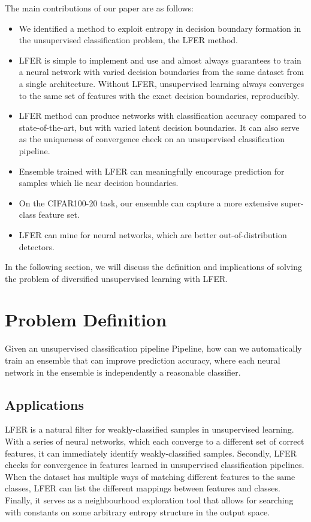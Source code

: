 \documentclass[journal]{journal}
\begin{document}
The main contributions of our paper are as follows:
\begin{itemize} 
\item We identified a method to exploit entropy in decision boundary formation in the unsupervised classification problem, the LFER method.
\item LFER is simple to implement and use and almost always guarantees to train a neural network with varied decision boundaries from the same dataset from a single architecture. Without LFER, unsupervised learning always converges to the same set of features with the exact decision boundaries,  reproducibly. 
\item LFER method can produce networks with classification accuracy compared to state-of-the-art, but with varied latent decision boundaries. It can also serve as the uniqueness of convergence check on an unsupervised classification pipeline.
\item Ensemble trained with LFER can meaningfully encourage prediction for samples which lie near decision boundaries. 
\item On the CIFAR100-20 task, our ensemble can capture a more extensive super-class feature set.
\item LFER can mine for neural networks, which are better out-of-distribution detectors.
\end{itemize}

In the following section, we will discuss the definition and implications of solving the problem of diversified unsupervised learning with LFER. 

\section{Problem Definition}
Given an unsupervised classification pipeline Pipeline, how can we automatically train an ensemble that can improve prediction accuracy,  where each neural network in the ensemble is independently a reasonable classifier.

\subsection{Applications} LFER is a natural filter for weakly-classified samples in unsupervised learning. With a series of neural networks, which each converge to a different set of correct features, it can immediately identify weakly-classified samples. Secondly, LFER checks for convergence in features learned in unsupervised classification pipelines. When the dataset has multiple ways of matching different features to the same classes, LFER can list the different mappings between features and classes. Finally, it serves as a neighbourhood exploration tool that allows for searching with constants on some arbitrary entropy structure in the output space.
\end{document}
